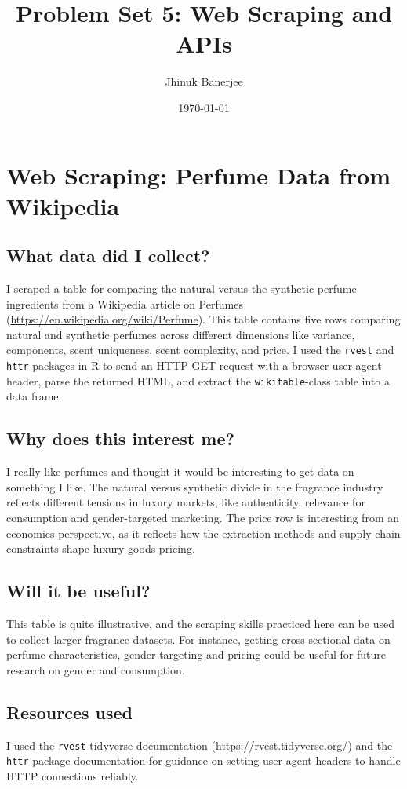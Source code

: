 \documentclass[12pt]{article}
\title{\textbf{Problem Set 5}: Web Scraping and APIs}
\author{Jhinuk Banerjee}
\date{\today}
\begin{document}
\maketitle

\section{Web Scraping: Perfume Data from Wikipedia}

\subsection*{What data did I collect?}
I scraped a table for comparing the natural versus the synthetic perfume
ingredients from a Wikipedia article on Perfumes
(\url{https://en.wikipedia.org/wiki/Perfume}).
This table contains five rows comparing natural and synthetic perfumes 
across different dimensions like variance, components, scent uniqueness,
scent complexity, and price. I used the \texttt{rvest} and
\texttt{httr} packages in R to send an HTTP GET request with a
browser user-agent header, parse the returned HTML, and extract
the \texttt{wikitable}-class table into a data frame.

\subsection*{Why does this interest me?}
I really like perfumes and thought it would be interesting to get data on something I like. The natural versus synthetic divide in the
fragrance industry reflects different tensions in luxury markets, like authenticity, relevance for
consumption and gender-targeted marketing. The price
row is interesting from an economics perspective,
as it reflects how the extraction methods and supply chain constraints
shape luxury goods pricing.

\subsection*{Will it be useful?}
This table is quite illustrative, and the scraping skills practiced here can be used to collect larger fragrance datasets. For instance, getting cross-sectional data on perfume characteristics,
gender targeting and pricing could be useful for future research
on gender and consumption.

\subsection*{Resources used}
I used the \texttt{rvest} tidyverse documentation
(\url{https://rvest.tidyverse.org/}) and the \texttt{httr} package
documentation for guidance on setting user-agent headers to
handle HTTP connections reliably.
\end{document}
